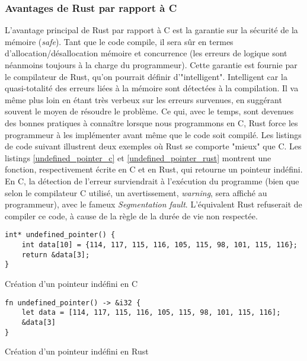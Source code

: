 \subsubsection{Avantages de Rust par rapport à C}
L'avantage principal de Rust par rapport à C est la garantie sur la sécurité de la mémoire (\textit{safe}). 
Tant que le code compile, il sera sûr en termes d'allocation/désallocation mémoire et concurrence 
(les erreurs de logique sont néanmoins toujours à la charge du programmeur). Cette garantie est 
fournie par le compilateur de Rust, qu'on pourrait définir d'"intelligent". Intelligent car la 
quasi-totalité des erreurs liées à la mémoire sont détectées à la compilation. Il va même plus 
loin en étant très verbeux sur les erreurs survenues, en suggérant souvent le moyen de résoudre 
le problème. Ce qui, avec le temps, sont devenues des bonnes pratiques à connaître lorsque 
nous programmons en C, Rust force les programmeur à les implémenter avant même que le code soit 
compilé. Les listings de code suivant illustrent deux exemples où Rust se comporte "mieux" que 
C. Les listings \ref{undefined_pointer_c} et \ref{undefined_pointer_rust} montrent une fonction, 
respectivement écrite en C et en Rust, qui retourne un pointeur indéfini. En C, la détection de 
l'erreur surviendrait à l'exécution du programme (bien que selon le compilateur C utilisé, un 
avertissement, \textit{warning}, sera affiché au programmeur), avec le fameux \textit{Segmentation fault}.
L'équivalent Rust refuserait de compiler ce code, à cause de la règle de la durée de vie non respectée.
\bigbreak
\begin{code}
    \begin{verbatim}
int* undefined_pointer() {
    int data[10] = {114, 117, 115, 116, 105, 115, 98, 101, 115, 116};
    return &data[3];
}
    \end{verbatim}
    \caption{Création d'un pointeur indéfini en C}
    \label{undefined_pointer_c}
\end{code}
\bigbreak
\begin{code}
    \begin{verbatim}
fn undefined_pointer() -> &i32 {
    let data = [114, 117, 115, 116, 105, 115, 98, 101, 115, 116];
    &data[3]
}
    \end{verbatim}
    \caption{Création d'un pointeur indéfini en Rust}
    \label{undefined_pointer_rust}
\end{code}
